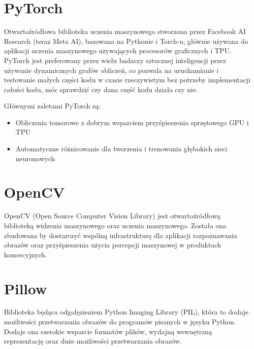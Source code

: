 \section{PyTorch}
Otwartoźródłowa biblioteka uczenia maszynowego stworzona przez Facebook AI Research (teraz Meta AI), bazowana na Pythonie i Torch-u, głównie używana do aplikacji uczenia maszynowego używających procesorów graficznych i TPU. PyTorch jest preferowany przez wielu badaczy sztucznej inteligencji przez używanie dynamicznych grafów obliczeń, co pozwala na uruchamianie i testowanie małych części kodu w czasie rzeczywistym bez potrzeby implementacji całości kodu, móc sprawdzić czy dana część kodu działa czy nie.

Głównymi zaletami PyTorch są:
\begin{itemize}
	\item Obliczenia tensorowe z dobrym wsparciem przyśpieszenia sprzętowego GPU i TPU
	\item Automatyczne różnicowanie dla tworzenia i trenowania głębokich sieci neuronowych
\end{itemize}

\section{OpenCV}
OpenCV (Open Source Computer Vision Library) jest otwartoźródłową biblioteką widzenia maszynowego oraz uczenia maszynowego. Została ona zbudowana by dostarczyć wspólną infrastrukturę dla aplikacji rozpoznawania obrazów oraz przyśpieszenia użycia percepcji maszynowej w produktach komercyjnych.

\section{Pillow}
Biblioteka będąca odgałęzieniem Python Imaging Library (PIL), która to dodaje możliwości przetwarzania obrazów do programów pisanych w języku Python. Dodaje ona szerokie wsparcie formatów plików, wydajną wewnętrzną reprezentację oraz duże możliwości przetwarzania obrazów. 